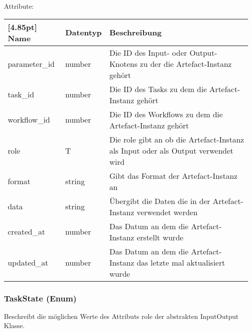     		Attribute:
            \begin{center}
            	\renewcommand{\arraystretch}{1.5}
                \setlength\tabcolsep{5pt}
            	\begin{tabularx}{\textwidth}{|l|l|X|}
            		\hline
                    \rowcolor[gray]{0.75}[4.85pt]            		
                    Name & Datentyp & Beschreibung \\ \hline
            	    parameter_id & number & Die ID des Input- oder Output-Knotens zu der die Artefact-Instanz gehört \\ \hline
            	    task_id & number & Die ID des Tasks zu dem die Artefact-Instanz gehört \\ \hline
            	    workflow_id & number & Die ID des Workflows zu dem die Artefact-Instanz gehört \\ \hline
            	    role & T & Die role gibt an ob die Artefact-Instanz als Input oder als Output verwendet wird \\ \hline
                    format & string & Gibt das Format der Artefact-Instanz an \\ \hline
                    data & string & Übergibt die Daten die in der Artefact-Instanz verwendet werden \\ \hline
                    created_at & number & Das Datum an dem die Artefact-Instanz erstellt wurde \\ \hline
            	    updated_at & number & Das Datum an dem die Artefact-Instanz das letzte mal aktualisiert wurde\\ \hline
            	\end{tabularx}
            \end{center}
            
    		\subsubsection{TaskState (Enum)}
			Beschreibt die möglichen Werte des Attributs role der abstrakten InputOutput Klasse. \newline
			
